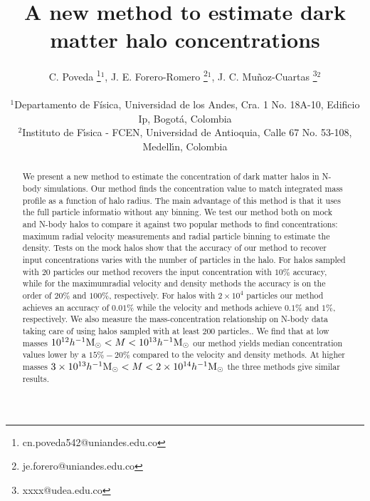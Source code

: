 \documentclass[a4,useAMS,usenatbib,usegraphicx]{mn2e}
\newcommand{\hMsun}{{\ifmmode{h^{-1}{\rm {M_{\odot}}}}\else{$h^{-1}{\rm{M_{\odot}}}$}\fi}}
\begin{document}
\title{A new method to estimate dark matter halo concentrations}
\author[C. Poveda, J.E. Forero-Romero & J.C. Mu\~noz-Cuartas]{
\parbox[t]{\textwidth}{\raggedright 
  C. Poveda \thanks{cn.poveda542@uniandes.edu.co}$^{1}$,
  J. E. Forero-Romero \thanks{je.forero@uniandes.edu.co}$^{1}$,
  J. C. Mu\~noz-Cuartas \thanks{xxxx@udea.edu.co}$^{2}$
}
\vspace*{6pt}\\
$^1$Departamento de F\'{i}sica, Universidad de los Andes, Cra. 1
No. 18A-10, Edificio Ip, Bogot\'a, Colombia\\
$^2$Instituto de F\'{\i}sica - FCEN, Universidad de Antioquia, Calle
67 No. 53-108, Medell\'{\i}n, Colombia
}

\maketitle

\begin{abstract}

We present a new method to estimate the concentration of dark matter
halos in N-body simulations.
Our method finds the concentration value to match integrated mass profile as a function of
halo radius.
The main advantage of this method is that it uses the full particle informatio
without any binning.
We test our method both on mock and N-body halos to compare it against
two popular methods to find concentrations: maximum radial velocity
measurements and radial particle binning to estimate the density.
Tests on the mock halos show that the accuracy of our method to
recover input concentrations varies with the number of particles in
the halo. 
For halos sampled with $20$ particles our method recovers the input
concentration with $10\%$ accuracy, while for the maximumradial
velocity and density methods the accuracy is on the order of $20\%$
and $100\%$, respectively.  
For halos with $2\times 10^4$ particles our method achieves an accuracy of
$0.01\%$ while the velocity and  methods achieve $0.1\%$ and $1\%$,
respectively.  
We also measure the mass-concentration relationship on N-body data
taking care of using halos sampled with at least $200$ particles..
We find that at low masses $10^{12}\hMsun < M<10^{13}\hMsun$ our
method yields median concentration values lower by a $15\%-20\%$
compared to the velocity and density methods. 
At higher masses $3\times 10^{13}\hMsun < M < 2\times 10^{14}\hMsun$ the
three methods give similar results.
\end{abstract}
\end{document}
